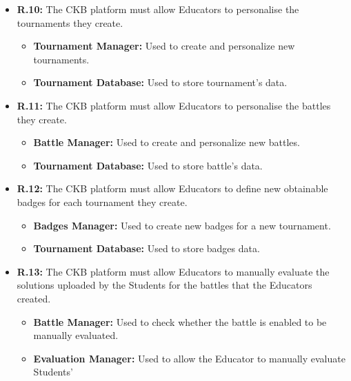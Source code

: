 \documentclass{article}
\begin{document}
{\begin{itemize}
\begin{itemize}
\begin{itemize}
              a battle within a certain tournament.
              \item \textbf{Battle Manager:} Used to create the new battle within the tournament.
              \item \textbf{Account Manager:} Used to retrieve Educator's data. 
              \item \textbf{Tournament Database:} Used to store the newly created battle's data.
          \end{itemize}
    \item \textbf{R.10:} The CKB platform must allow Educators to personalise the tournaments they create.
          \begin{itemize}
              \item \textbf{Tournament Manager:} Used to create and personalize new tournaments.
              \item \textbf{Tournament Database:} Used to store tournament's data.
          \end{itemize}
    \item \textbf{R.11:} The CKB platform must allow Educators to personalise the battles they create.
          \begin{itemize}
              \item \textbf{Battle Manager:} Used to create and personalize new battles.
              \item \textbf{Tournament Database:} Used to store battle's data.
          \end{itemize}
    \item \textbf{R.12:} The CKB platform must allow Educators to define new obtainable badges for each tournament they
          create.
          \begin{itemize}
              \item \textbf{Badges Manager:} Used to create new badges for a new tournament.
              \item \textbf{Tournament Database:} Used to store badges data.
          \end{itemize}
    \item \textbf{R.13:} The CKB platform must allow Educators to manually evaluate the solutions uploaded by the Students for the battles that
          the Educators created.
          \begin{itemize}
              \item \textbf{Battle Manager:} Used to check whether the battle is enabled to be manually
              evaluated.
              \item \textbf{Evaluation Manager:} Used to allow the Educator to manually evaluate Students'

\end{itemize}
\end{itemize}
\end{itemize}}
\end{document}
